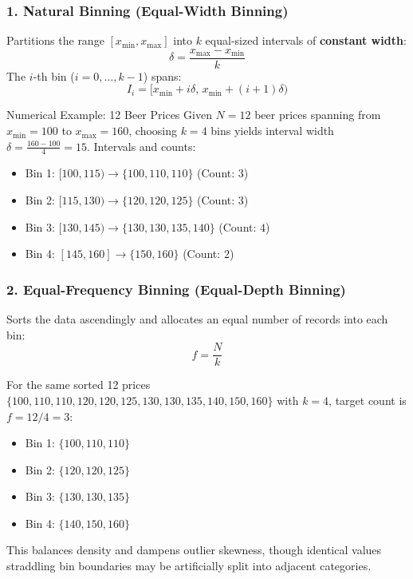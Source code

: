 \subsubsection{1. Natural Binning (Equal-Width Binning)}
Partitions the range $[x_{\min}, x_{\max}]$ into $k$ equal-sized intervals of \textbf{constant width}:
\begin{equation}
    \delta = \frac{x_{\max} - x_{\min}}{k}
\end{equation}
The $i$-th bin ($i = 0, \dots, k-1$) spans:
\begin{equation}
    I_i = \big[x_{\min} + i\delta,\, x_{\min} + (i+1)\delta\big)
\end{equation}

\begin{noteblock}{Numerical Example: 12 Beer Prices}
Given $N=12$ beer prices spanning from $x_{\min}=100$ to $x_{\max}=160$, choosing $k=4$ bins yields interval width $\delta = \frac{160-100}{4} = 15$. Intervals and counts:
\begin{itemize}[noitemsep]
    \item Bin 1: $[100, 115) \to \{100, 110, 110\}$ (Count: $3$)
    \item Bin 2: $[115, 130) \to \{120, 120, 125\}$ (Count: $3$)
    \item Bin 3: $[130, 145) \to \{130, 130, 135, 140\}$ (Count: $4$)
    \item Bin 4: $[145, 160] \to \{150, 160\}$ (Count: $2$)
\end{itemize}
\end{noteblock}

\subsubsection{2. Equal-Frequency Binning (Equal-Depth Binning)}
Sorts the data ascendingly and allocates an equal number of records into each bin:
\begin{equation}
    f = \frac{N}{k}
\end{equation}

For the same sorted 12 prices $\{100, 110, 110, 120, 120, 125, 130, 130, 135, 140, 150, 160\}$ with $k=4$, target count is $f = 12/4 = 3$:
\begin{itemize}[noitemsep]
    \item Bin 1: $\{100, 110, 110\}$
    \item Bin 2: $\{120, 120, 125\}$
    \item Bin 3: $\{130, 130, 135\}$
    \item Bin 4: $\{140, 150, 160\}$
\end{itemize}
This balances density and dampens outlier skewness, though identical values straddling bin boundaries may be artificially split into adjacent categories.

